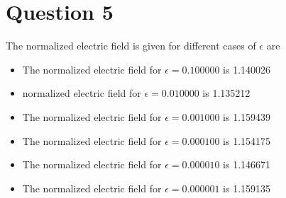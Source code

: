 \documentclass[11pt, a4paper]{article}
\begin{document}
\section{Question 5}
The normalized electric field is given for different cases of $\epsilon$ are 
\begin{itemize}
 \item The normalized electric field for $\epsilon = 0.100000$ is 1.140026
  \item normalized electric field for $\epsilon = 0.010000$ is 1.135212
  \item The normalized electric field for $\epsilon = 0.001000$ is 1.159439
  \item The normalized electric field for $\epsilon = 0.000100$ is 1.154175
  \item The normalized electric field for $\epsilon = 0.000010$ is 1.146671
  \item The normalized electric field for $\epsilon = 0.000001$ is 1.159135
\end{itemize}
\end{document}

